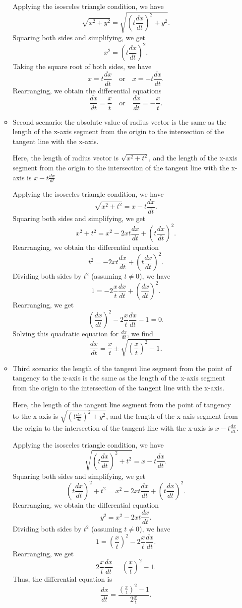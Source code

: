 \documentclass[12pt]{article}
\begin{document}
\begin{enumerate}[label=\textbf{Exercise \arabic*:}]
\begin{itemize}
        Applying the isosceles triangle condition, we have
        \[\sqrt{x^2 + y^2} = \sqrt{(t\frac{dx}{dt})^2+y^2}.\]
        Squaring both sides and simplifying, we get
        \[x^2 = (t\frac{dx}{dt})^2.\]
        Taking the square root of both sides, we have
        \[x = t\frac{dx}{dt} \quad \text{or} \quad x = -t\frac{dx}{dt}.\]
        Rearranging, we obtain the differential equations
        \[\frac{dx}{dt} = \frac{x}{t} \quad \text{or} \quad \frac{dx}{dt} = -\frac{x}{t}.\]

        \item Second scenario: the absolute value of radius vector is the same as the length 
        of the x-axis segment from the origin to the intersection of the tangent line with the x-axis.

        Here, the length of radius vector is $\sqrt{x^2 + t^2}$, and the length of the x-axis
        segment from the origin to the intersection of the tangent line with the x-axis is $x - t\frac{dx}{dt}$

        Applying the isosceles triangle condition, we have
        \[\sqrt{x^2 + t^2} = x - t\frac{dx}{dt}.\]
        Squaring both sides and simplifying, we get
        \[x^2 + t^2 = x^2 - 2xt\frac{dx}{dt} + (t\frac{dx}{dt})^2.\]
        Rearranging, we obtain the differential equation
        \[t^2 = - 2xt\frac{dx}{dt} + (t\frac{dx}{dt})^2.\]
        Dividing both sides by $t^2$ (assuming $t \neq 0$), we have
        \[1 = - 2\frac{x}{t}\frac{dx}{dt} + (\frac{dx}{dt})^2.\]
        Rearranging, we get
        \[(\frac{dx}{dt})^2 - 2\frac{x}{t}\frac{dx}{dt} - 1 = 0.\]
        Solving this quadratic equation for $\frac{dx}{dt}$, we find
        \[\frac{dx}{dt} = \frac{x}{t} \pm \sqrt{(\frac{x}{t})^2 + 1}.\]

        \item Third scenario: the length of the tangent line segment from the point of tangency to the x-axis
        is the same as the length of the x-axis segment from the origin to the intersection of the tangent line with the x-axis.

        Here, the length of the tangent line segment from the point of tangency to the x-axis is $\sqrt{(t\frac{dx}{dt})^2+y^2}$, and the length of the x-axis segment from the origin to the intersection of the tangent line with the
        x-axis is $x - t\frac{dx}{dt}$.

        Applying the isosceles triangle condition, we have
        \[\sqrt{(t\frac{dx}{dt})^2+t^2} = x - t\frac{dx}{dt}.\]
        Squaring both sides and simplifying, we get
        \[(t\frac{dx}{dt})^2+t^2 = x^2 - 2xt\frac{dx}{dt} + (t\frac{dx}{dt})^2.\]
        Rearranging, we obtain the differential equation
        \[y^2 = x^2 - 2xt\frac{dx}{dt}.\]
        Dividing both sides by $t^2$ (assuming $t \neq 0$), we have
        \[1 = (\frac{x}{t})^2 - 2\frac{x}{t}\frac{dx}{dt}.\]
        Rearranging, we get
        \[2\frac{x}{t}\frac{dx}{dt} = (\frac{x}{t})^2 - 1.\]
        Thus, the differential equation is
        \[\frac{dx}{dt} = \frac{(\frac{x}{t})^2 - 1}{2\frac{x}{t}}.\]
    \end{itemize}




\end{enumerate}
\end{document}
